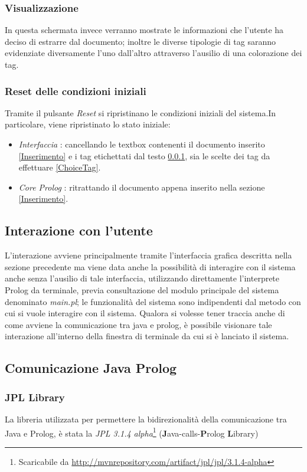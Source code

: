    \subsubsection{Visualizzazione}
    \label{Visualization}
    In questa schermata invece verranno mostrate le informazioni che l'utente ha deciso di estrarre dal documento; inoltre le diverse tipologie di tag saranno evidenziate diversamente l'uno dall'altro attraverso l'ausilio di una colorazione dei tag. 

    \subsubsection{Reset delle condizioni iniziali}
    Tramite il pulsante \emph{Reset} si ripristinano le condizioni iniziali del sistema.In particolare, viene ripristinato lo stato iniziale:
    \begin{itemize}
      \item \emph{Interfaccia} : cancellando le textbox contenenti il documento inserito \ref{Inserimento} e i tag etichettati dal testo \ref{Visualization}, sia le scelte dei tag da effettuare \ref{ChoiceTag}.
      \item \emph{Core Prolog} : ritrattando il documento appena inserito nella sezione \ref{Inserimento}.
    \end{itemize}
    
\subsection{Interazione con l'utente} %
L’interazione avviene principalmente tramite l'interfaccia grafica descritta nella sezione precedente ma viene data anche la possibilità di interagire con il sistema anche senza l'ausilio di tale interfaccia, utilizzando direttamente l'interprete Prolog da terminale, previa consultazione del modulo principale del sistema denominato \emph{main.pl}; le funzionalità del sistema sono indipendenti dal metodo con cui si vuole interagire con il  sistema. Qualora si volesse tener traccia anche di come avviene la comunicazione tra java e prolog, è possibile visionare tale interazione all'interno della finestra di terminale da cui si è lanciato il sistema.

\subsection{Comunicazione Java Prolog}
\subsubsection{JPL Library}
\nocite{swi:jpl}
La libreria utilizzata per permettere la bidirezionalità della comunicazione tra Java e Prolog, è stata la \emph{JPL 3.1.4 alpha}\footnote{Scaricabile da \url{http://mvnrepository.com/artifact/jpl/jpl/3.1.4-alpha}} (\textbf{J}ava-calls-\textbf{P}rolog \textbf{L}ibrary)


